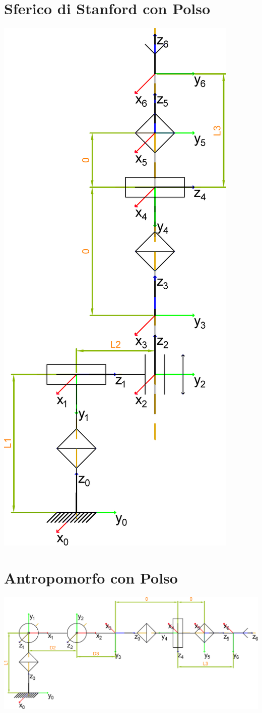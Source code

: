 \documentclass[a4paper,11pt]{article}
\begin{document}
\section*{Sferico di Stanford con Polso}
\includegraphics{Sorgenti/Strutture+Polso/SfericoStanford+p.png}


\section*{Antropomorfo con Polso}
\includegraphics{Sorgenti/Strutture+Polso/Antropomorfo+p.png}

\end{document}
